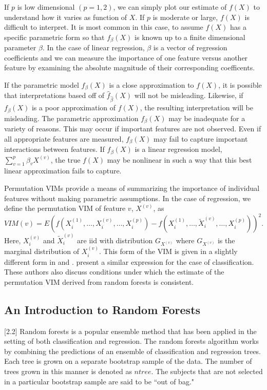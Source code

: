 \documentclass[article,shortnames]{jss}
\begin{document}
If $p$ is low dimensional $(p=1,2)$, we can simply plot our estimate of $f(X)$ to understand how it varies as function of $X$. 
If $p$ is moderate or large, $f(X)$ is difficult to interpret.  It is most common in this case, to assume $f(X)$ has a specific parametric
form so that $f_{\beta}(X)$ is known up to a finite dimensional parameter $\beta$.  In the case of linear regression, $\beta$ is a vector of
regression coefficients and we can measure the importance of one feature versus another feature by examining the absolute magnitude 
of their corresponding coefficents.    

If the parametric model $f_{\beta}(X)$ is a close approximation to $f(X)$, it is possible that interpretations based off of $\hat{f}_{\hat{\beta}}(X)$
will not be misleading.  Likewise, if $f_{\beta}(X)$ is a poor approximation of $f(X)$, the resulting interpretation will be misleading.  
The parametric approximation $f_{\beta}(X)$ may be inadequate for a variety of reasons.  This may occur if important features are 
not observed.  Even if all appropriate features are measured, $f_{\beta}(X)$ may fail to capture important interactions between features.
If $f_{\beta}(X)$ is a linear regression model, $\sum_{v=1}^{p}\beta_{v}X^{(v)}$, the true $f(X)$ may be nonlinear in such a way that this best linear approximation fails to capture.
  
Permutation VIMs provide a means of summarizing the importance of individual features without making parametric assumptions.
In the case of regression, we define the permutation VIM of feature $v$, $X^{(v)}$, as 
\begin{equation}
VIM(v)=E(f(X^{(1)}_{i},\ldots,X^{(v)}_{i},\ldots,X^{(p)}_{i}) - f(X^{(1)}_{i},\ldots,\tilde{X}^{(v)}_{i},\ldots,X^{(p)}_{i}))^{2}.
\end{equation}
Here, $X^{(v)}_{i}$ and $\tilde{X}^{(v)}_{i}$ are iid with distribution $G_{X^{(v)}}$ where $G_{X^{(v)}}$ is the marginal distribution of $X^{(v)}_{i}$.  This form of the VIM
is given in a slightly different form in \cite{gregorutti2013correlation} and \cite{zhu2012reinforcement}.
\cite{gregorutti2013correlation} present a similar expression for the case of classification.  
These authors also discuss conditions under which the estimate of the permutation VIM derived from random forests is consistent. 

         
\subsection{An Introduction to Random Forests}[2.2]
Random forests is a popular ensemble method that has been applied in the setting of both classification and regression.  The random forests algorithm works
by combining the predictions of an ensemble of classification and regression trees.  Each tree is grown on a separate bootstrap sample of the data.  The number
of trees grown in this manner is denoted as $ntree$.  The subjects that are not selected in a particular bootstrap sample are said to be ``out of bag."  
\end{document}
